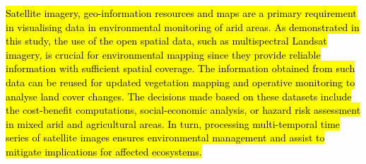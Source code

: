 \documentclass[final,5p,times,twocolumn]{elsarticle}
\begin{document}
\hl{Satellite imagery, geo-information resources and maps are a primary requirement in visualising data in environmental monitoring of arid areas. As demonstrated in this study, the use of the open spatial data, such as multispectral Landsat imagery, is crucial for environmental mapping since they provide reliable information with sufficient spatial coverage. The information obtained from such data can be reused for updated vegetation mapping and operative monitoring to analyse land cover changes. The decisions made based on these datasets include the cost-benefit computations, social-economic analysis, or hazard risk assessment in mixed arid and agricultural areas. In turn, processing multi-temporal time series of satellite images ensures environmental management and assist to mitigate implications for affected ecosystems.}

\appendix

 


\end{document}
